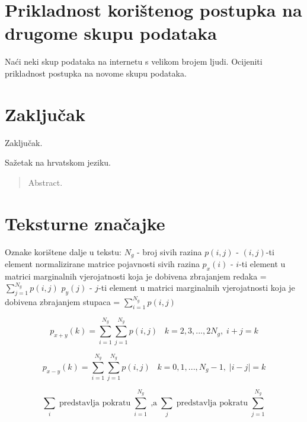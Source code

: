 \documentclass[times, utf8, zavrsni]{fer}
\begin{document}
\chapter{Prikladnost korištenog postupka na drugome skupu podataka}

Naći neki skup podataka na internetu s velikom brojem ljudi.
\newline
Ocijeniti prikladnost postupka na novome skupu podataka.




\chapter{Zaključak}
Zaključak.




\listoffigures

\begin{sazetak}
Sažetak na hrvatskom jeziku.

\end{sazetak}

\begin{abstract}
Abstract.

\end{abstract}

\appendix

\chapter{Teksturne značajke}

Oznake korištene dalje u tekstu:
\bigbreak
\(N_g\) - broj sivih razina
\(p(i,j)\) - \((i,j)\)-ti element normalizirane matrice pojavnosti sivih razina
\bigbreak
\(p_x(i)\) - \(i\)-ti element u matrici marginalnih vjerojatnosti koja je dobivena 
zbrajanjem redaka = \(\sum_{j=1}^{N_g}p(i,j)\)
\bigbreak
\(p_y(j)\) - \(j\)-ti element u matrici marginalnih vjerojatnosti koja je dobivena 
zbrajanjem stupaca = \(\sum_{i=1}^{N_g}p(i,j)\)

\[
p_{x+y}(k)=\sum_{i=1}^{N_g} \sum_{j=1}^{N_g} p(i,j) \;\;\; k=2,3,...,2N_g, \; i+j=k
\]

\[
p_{x-y}(k)=\sum_{i=1}^{N_g} \sum_{j=1}^{N_g} p(i,j) \;\;\; k=0,1,...,N_g-1, \; \left|i-j\right|=k
\]

\[
\sum_i \; \textrm{predstavlja pokratu} \; \sum_{i=1}^{N_g} \; \textrm{,a} \;
\sum_{j} \; \textrm{predstavlja pokratu} \; \sum_{j=1}^{N_g}
\]
\end{document}
